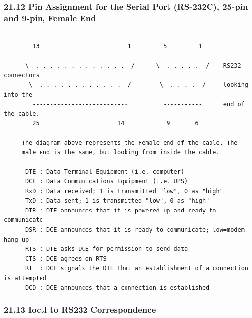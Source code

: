 {{{{{{{{{{\begin{longtable}{llll}
\end{longtable}

\label{Pin-Assignment-for-the-Serial-Port-_005bRS_002d232C_005d_003b-25_002dpi%
n-and-9_002dpin_003b-Female-End}

\subsubsection*{21.12 Pin Assignment for the Serial Port (RS-232C), 25-pin and
9-pin, Female End}

\label{index-Cables-217}

\footnotesize
\begin{verbatim}
     
        13                         1         5         1
      _______________________________      _______________
      \  . . . . . . . . . . . . .  /      \  . . . . .  /    RS232-connectors
       \  . . . . . . . . . . . .  /        \  . . . .  /     looking into the
        ---------------------------          -----------      end of the cable.
        25                      14            9       6
     
     The diagram above represents the Female end of the cable. The
     male end is the same, but looking from inside the cable.
     
      DTE : Data Terminal Equipment (i.e. computer)
      DCE : Data Communications Equipment (i.e. UPS)
      RxD : Data received; 1 is transmitted "low", 0 as "high"
      TxD : Data sent; 1 is transmitted "low", 0 as "high"
      DTR : DTE announces that it is powered up and ready to communicate
      DSR : DCE announces that it is ready to communicate; low=modem hang-up
      RTS : DTE asks DCE for permission to send data
      CTS : DCE agrees on RTS
      RI  : DCE signals the DTE that an establishment of a connection is attempted
      DCD : DCE announces that a connection is established
\end{verbatim}
\normalsize

\label{Ioctl-to-RS232-Correspondence}

\subsubsection*{21.13 Ioctl to RS232 Correspondence}

}}}}}}}}}}
